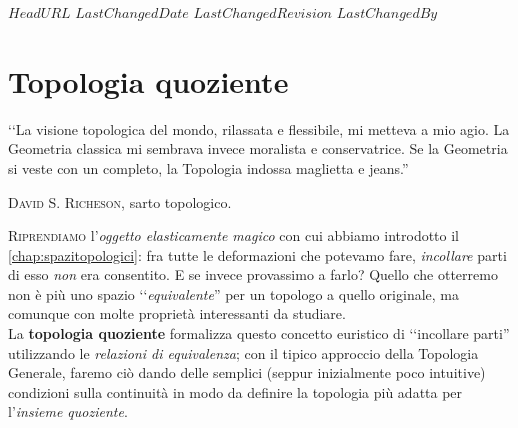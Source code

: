 \svnidlong
{$HeadURL$}
{$LastChangedDate$}
{$LastChangedRevision$}
{$LastChangedBy$}

\chapter{Topologia quoziente}

\begin{introduction}
‘‘La visione topologica del mondo, rilassata e flessibile, mi metteva a mio agio. La Geometria classica mi sembrava invece moralista e conservatrice. Se la Geometria si veste con un completo, la Topologia indossa maglietta e jeans.''
\begin{flushright}
	\textsc{David S. Richeson,} sarto topologico.
\end{flushright}
\end{introduction}
\lettrine[findent=1pt, nindent=0pt]{R}{iprendiamo} l'\textit{oggetto elasticamente magico} con cui abbiamo introdotto il \autoref{chap:spazitopologici}: fra tutte le deformazioni che potevamo fare, \textit{incollare} parti di esso \textit{non} era consentito. E se invece provassimo a farlo? Quello che otterremo non è più uno spazio ‘‘\textit{equivalente}'' per un topologo a quello originale, ma comunque con molte proprietà interessanti da studiare.\\
La \textbf{topologia quoziente} formalizza questo concetto euristico di ‘‘incollare parti'' utilizzando le \textit{relazioni di equivalenza}; con il tipico approccio della Topologia Generale, faremo ciò dando delle semplici (seppur inizialmente poco intuitive) condizioni sulla continuità in modo da definire la topologia più adatta per l'\textit{insieme quoziente}.

